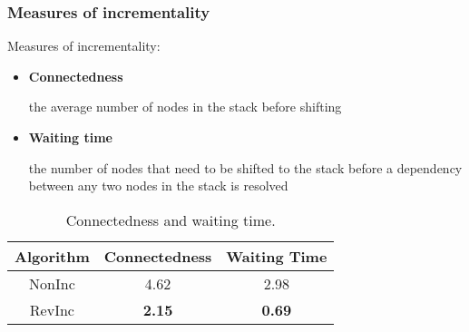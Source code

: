 \documentclass[10pt,usepdftitle=false,hyperref={unicode}]{beamer}
\begin{document}
\begin{frame}
    \frametitle{Measures of incrementality}
    Measures of incrementality:
    \begin{itemize}
        \item \textbf{Connectedness}

            the average number of nodes in the stack before shifting

        \item \textbf{Waiting time}

            the number of nodes that need to be shifted to the stack
            before a dependency between any two nodes in the stack is resolved
    \end{itemize}

    \smallskip

    \begin{center}
        \begin{table}
        \caption{Connectedness and waiting time.}
        \begin{tabular}{ccc}
            \toprule
            Algorithm  & Connectedness & Waiting Time  \\
            \midrule
            NonInc     & 4.62          & 2.98          \\
            RevInc     & \textbf{2.15} & \textbf{0.69} \\
            \bottomrule
        \end{tabular}
        \end{table}
    \end{center}
\end{frame}
\end{document}
